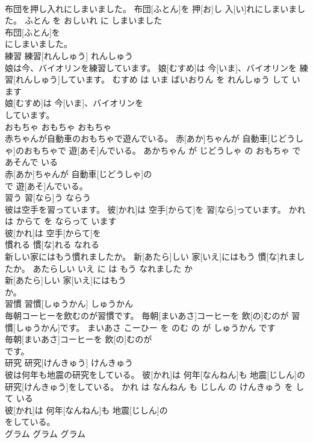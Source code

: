\documentclass[8pt]{extreport}
\begin{document}
\begin{CJK}{UTF8}{min}
\\	布団を押し入れにしまいました。	布団[ふとん]を 押[お]し 入[い]れにしまいました。	ふとん を おしいれ に しまいました	
\\	布団[ふとん]を
\\	にしまいました。		
\\	練習	練習[れんしゅう]	れんしゅう	
\\	娘は今、バイオリンを練習しています。	娘[むすめ]は 今[いま]、バイオリンを 練習[れんしゅう]しています。	むすめ は いま ばいおりん を れんしゅう して います	
\\	娘[むすめ]は 今[いま]、バイオリンを
\\	しています。		
\\	おもちゃ	おもちゃ	おもちゃ	
\\	赤ちゃんが自動車のおもちゃで遊んでいる。	赤[あか]ちゃんが 自動車[じどうしゃ]のおもちゃで 遊[あそ]んでいる。	あかちゃん が じどうしゃ の おもちゃ で あそんで いる	
\\	赤[あか]ちゃんが 自動車[じどうしゃ]の
\\	で 遊[あそ]んでいる。		
\\	習う	習[なら]う	ならう	
\\	彼は空手を習っています。	彼[かれ]は 空手[からて]を 習[なら]っています。	かれ は からて を ならって います	
\\	彼[かれ]は 空手[からて]を
\\	慣れる	慣[な]れる	なれる	
\\	新しい家にはもう慣れましたか。	新[あたら]しい 家[いえ]にはもう 慣[な]れましたか。	あたらしい いえ に は もう なれました か	
\\	新[あたら]しい 家[いえ]にはもう
\\	か。		
\\	習慣	習慣[しゅうかん]	しゅうかん	
\\	毎朝コーヒーを飲むのが習慣です。	毎朝[まいあさ]コーヒーを 飲[の]むのが 習慣[しゅうかん]です。	まいあさ こーひー を のむ の が しゅうかん です	
\\	毎朝[まいあさ]コーヒーを 飲[の]むのが
\\	です。		
\\	研究	研究[けんきゅう]	けんきゅう	
\\	彼は何年も地震の研究をしている。	彼[かれ]は 何年[なんねん]も 地震[じしん]の 研究[けんきゅう]をしている。	かれ は なんねん も じしん の けんきゅう を して いる	
\\	彼[かれ]は 何年[なんねん]も 地震[じしん]の
\\	をしている。		
\\	グラム	グラム	グラム	

\end{CJK}
\end{document}
